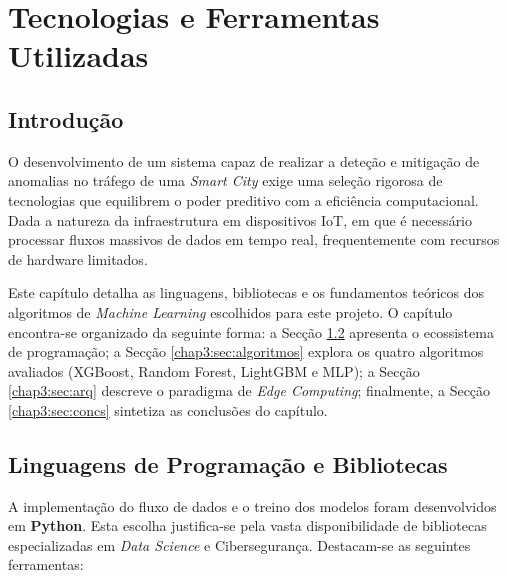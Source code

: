 \chapter{Tecnologias e Ferramentas Utilizadas}
\label{chap:tecno-ferra}

\section{Introdução}
\label{chap3:sec:intro}
O desenvolvimento de um sistema capaz de realizar a deteção e mitigação de anomalias no tráfego de uma \textit{Smart City} exige uma seleção rigorosa de tecnologias que equilibrem o poder preditivo com a eficiência computacional. Dada a natureza da infraestrutura em dispositivos \ac{IoT}, em que é necessário processar fluxos massivos de dados em tempo real, frequentemente com recursos de hardware limitados.

Este capítulo detalha as linguagens, bibliotecas e os fundamentos teóricos dos algoritmos de \textit{Machine Learning} escolhidos para este projeto. O capítulo encontra-se organizado da seguinte forma: a Secção \ref{chap3:sec:ling} apresenta o ecossistema de programação; a Secção \ref{chap3:sec:algoritmos} explora os quatro algoritmos avaliados (\ac{XGBoost}, Random Forest, \ac{LightGBM} e \ac{MLP}); a Secção \ref{chap3:sec:arq} descreve o paradigma de \textit{Edge Computing}; finalmente, a Secção \ref{chap3:sec:concs} sintetiza as conclusões do capítulo.

\section{Linguagens de Programação e Bibliotecas}
\label{chap3:sec:ling}

A implementação do fluxo de dados e o treino dos modelos foram desenvolvidos em \textbf{Python}. Esta escolha justifica-se pela vasta disponibilidade de bibliotecas especializadas em \textit{Data Science} e Cibersegurança. Destacam-se as seguintes ferramentas:

